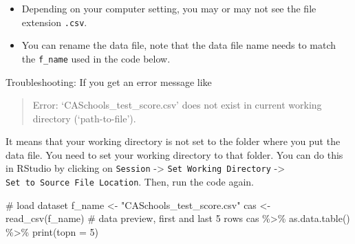 \documentclass[
  12pt,
  letterpaper,
]{scrbook}
\newenvironment{Shaded}{\begin{snugshade}}{\end{snugshade}}
\newcommand{\AttributeTok}[1]{\textcolor[rgb]{0.40,0.45,0.13}{#1}}
\newcommand{\CommentTok}[1]{\textcolor[rgb]{0.37,0.37,0.37}{#1}}
\newcommand{\DecValTok}[1]{\textcolor[rgb]{0.68,0.00,0.00}{#1}}
\newcommand{\FunctionTok}[1]{\textcolor[rgb]{0.28,0.35,0.67}{#1}}
\newcommand{\NormalTok}[1]{\textcolor[rgb]{0.00,0.23,0.31}{#1}}
\newcommand{\OtherTok}[1]{\textcolor[rgb]{0.00,0.23,0.31}{#1}}
\newcommand{\SpecialCharTok}[1]{\textcolor[rgb]{0.37,0.37,0.37}{#1}}
\newcommand{\StringTok}[1]{\textcolor[rgb]{0.13,0.47,0.30}{#1}}
\providecommand{\tightlist}{%
  \setlength{\itemsep}{0pt}\setlength{\parskip}{0pt}}
\renewcommand{\tightlist}{\setlength{\itemsep}{0.5\baselineskip}\setlength{\parskip}{0.2\baselineskip}}
\theoremstyle{plain}
\theoremstyle{definition}
\theoremstyle{remark}
\begin{document}
\begin{itemize}
\tightlist
\item
  Depending on your computer setting, you may or may not see the file
  extension \texttt{.csv}.
\item
  You can rename the data file, note that the data file name needs to
  match the \texttt{f\_name} used in the code below.
\end{itemize}

Troubleshooting: If you get an error message like

\begin{quote}
Error: `CASchools\_test\_score.csv' does not exist in current working
directory (`path-to-file').
\end{quote}

It means that your working directory is not set to the folder where you
put the data file. You need to set your working directory to that
folder. You can do this in RStudio by clicking on \texttt{Session}
-\textgreater{} \texttt{Set\ Working\ Directory} -\textgreater{}
\texttt{Set\ to\ Source\ File\ Location}. Then, run the code again.

\begin{Shaded}
\begin{Highlighting}[]
\CommentTok{\# load dataset}
\NormalTok{f\_name }\OtherTok{\textless{}{-}} \StringTok{"CASchools\_test\_score.csv"}
\NormalTok{cas }\OtherTok{\textless{}{-}} \FunctionTok{read\_csv}\NormalTok{(f\_name)}
\CommentTok{\# data preview, first and last 5 rows}
\NormalTok{cas }\SpecialCharTok{\%\textgreater{}\%} \FunctionTok{as.data.table}\NormalTok{() }\SpecialCharTok{\%\textgreater{}\%} \FunctionTok{print}\NormalTok{(}\AttributeTok{topn =} \DecValTok{5}\NormalTok{)}
\end{Highlighting}
\end{Shaded}
\end{document}
